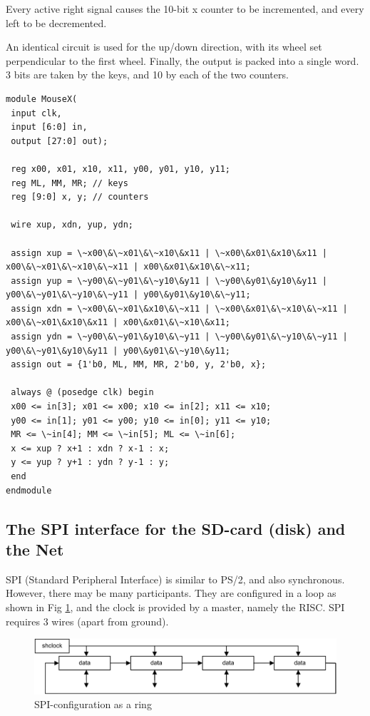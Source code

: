 Every active right signal causes the 10-bit x counter to be incremented, and every left to be
decremented.

An identical circuit is used for the up/down direction, with its wheel set perpendicular to the first
wheel. Finally, the output is packed into a single word. 3 bits are taken by the keys, and 10 by each of
the two counters.
\begin{verbatim}
module MouseX(
 input clk,
 input [6:0] in,
 output [27:0] out);

 reg x00, x01, x10, x11, y00, y01, y10, y11;
 reg ML, MM, MR; // keys
 reg [9:0] x, y; // counters

 wire xup, xdn, yup, ydn;

 assign xup = \~x00\&\~x01\&\~x10\&x11 | \~x00\&x01\&x10\&x11 | x00\&\~x01\&\~x10\&\~x11 | x00\&x01\&x10\&\~x11;
 assign yup = \~y00\&\~y01\&\~y10\&y11 | \~y00\&y01\&y10\&y11 | y00\&\~y01\&\~y10\&\~y11 | y00\&y01\&y10\&\~y11;
 assign xdn = \~x00\&\~x01\&x10\&\~x11 | \~x00\&x01\&\~x10\&\~x11 | x00\&\~x01\&x10\&x11 | x00\&x01\&\~x10\&x11;
 assign ydn = \~y00\&\~y01\&y10\&\~y11 | \~y00\&y01\&\~y10\&\~y11 | y00\&\~y01\&y10\&y11 | y00\&y01\&\~y10\&y11;
 assign out = {1'b0, ML, MM, MR, 2'b0, y, 2'b0, x};

 always @ (posedge clk) begin
 x00 <= in[3]; x01 <= x00; x10 <= in[2]; x11 <= x10;
 y00 <= in[1]; y01 <= y00; y10 <= in[0]; y11 <= y10;
 MR <= \~in[4]; MM <= \~in[5]; ML <= \~in[6];
 x <= xup ? x+1 : xdn ? x-1 : x;
 y <= yup ? y+1 : ydn ? y-1 : y;
 end
endmodule
\end{verbatim}

\subsection{The SPI interface for the SD-card (disk) and the Net}
\label{sub:spi}
SPI (Standard Peripheral Interface) is similar to PS/2, and also synchronous. However, there may
be many participants. They are configured in a loop as shown in Fig \ref{fig:ring}, and the clock is
provided by a master, namely the RISC. SPI requires 3 wires (apart from ground).
\begin{figure}[h!]
  \centering
  \includegraphics[width=.9\textwidth]{i/G/6.png}
  \caption{SPI-configuration as a ring}
  \label{fig:ring}
\end{figure}


